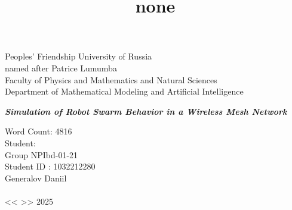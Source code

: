\documentclass[%
]{article}
\begin{document}

\title{none}

\begin{titlepage}

  \begin{center}
  \hfill \break
  \large{Peoples’ Friendship University of Russia}\\
  \large{named after Patrice Lumumba}\\
  \normalsize{Faculty of Physics and Mathematics and Natural Sciences}\\ 
  \normalsize{Department of Mathematical Modeling and Artificial Intelligence}\\

  \vspace*{\fill}

 
  \vspace*{\fill}
  \textbf{\textit{
    Simulation of Robot Swarm Behavior in a Wireless Mesh Network
  }}

  \vspace*{\fill}

  \end{center}
   
   \begin{flushright}
    Word Count: 4816 \\
    Student: \\
    Group NPIbd-01-21\\
    Student ID \textnumero{}: 1032212280 \\
    Generalov Daniil \\
    \underline{\phantom{signature signature}} \\
    << \underline{\phantom{day}} >> \underline{\phantom{month month}} 2025
   \end{flushright}

   \vspace*{\fill}


\end{titlepage}
\end{document}
